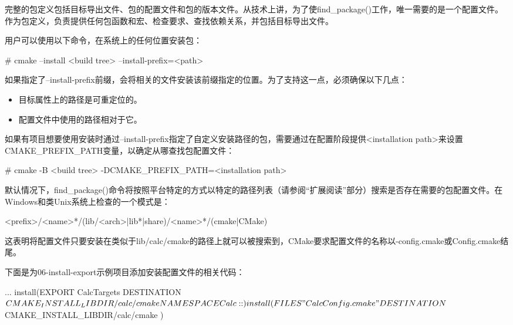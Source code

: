 
完整的包定义包括目标导出文件、包的配置文件和包的版本文件。从技术上讲，为了使find\_package()工作，唯一需要的是一个配置文件。作为包定义，负责提供任何包函数和宏、检查要求、查找依赖关系，并包括目标导出文件。

用户可以使用以下命令，在系统上的任何位置安装包：

\begin{shell}
# cmake --install <build tree> --install-prefix=<path>
\end{shell}

如果指定了--install-prefix前缀，会将相关的文件安装该前缀指定的位置。为了支持这一点，必须确保以下几点：

\begin{itemize}
\item
目标属性上的路径是可重定位的。

\item
配置文件中使用的路径相对于它。
\end{itemize}

如果有项目想要使用安装时通过--install-prefix指定了自定义安装路径的包，需要通过在配置阶段提供<installation path>来设置CMAKE\_PREFIX\_PATH变量，以确定从哪查找包配置文件：

\begin{shell}
# cmake -B <build tree> -DCMAKE_PREFIX_PATH=<installation path>
\end{shell}

默认情况下，find\_package()命令将按照平台特定的方式以特定的路径列表（请参阅“扩展阅读”部分）搜索是否存在需要的包配置文件。在Windows和类Unix系统上检查的一个模式是：

\begin{shell}
<prefix>/<name>*/(lib/<arch>|lib*|share)/<name>*/(cmake|CMake)
\end{shell}

这表明将配置文件只要安装在类似于lib/calc/cmake的路径上就可以被搜索到，CMake要求配置文件的名称以-config.cmake或Config.cmake结尾。

下面是为06-install-export示例项目添加安装配置文件的相关代码：


\begin{cmake}
...
install(EXPORT CalcTargets
    DESTINATION ${CMAKE_INSTALL_LIBDIR}/calc/cmake
    NAMESPACE Calc::
)
install(FILES "CalcConfig.cmake"
    DESTINATION ${CMAKE_INSTALL_LIBDIR}/calc/cmake
)
\end{cmake}

